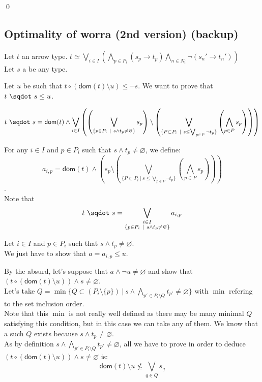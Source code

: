 \documentclass[a4paper]{article}%
\newcommand{\worra}[2]{#1\mathop{\,\sqdot\,} #2}
\newcommand{\apply}[2]{#1\circ#2}
\newcommand{\dom}[1]{\textsf{dom}(#1)}
\newcommand{\alt}{~|~}
\begin{document}
    \qed

    \pagebreak

    \subsection{Optimality of worra (2nd version) (backup)}

    Let $t$ an arrow type. $t \simeq \bigvee_{i\in I}\left(\bigwedge_{p\in P_i}(s_p\to t_p)\bigwedge_{n\in N_i}\neg(s_n'\to t_n')\right)$\\
    Let $s$ a be any type.

    Let $u$ be such that $\apply t {(\dom t \setminus u)} \leq \neg s$. We want to prove that $\worra t s \leq u$.

    \[\worra t s = \dom t \wedge\bigvee_{i\in I}\left(\left(\bigvee_{\{p\in P_i\alt s\wedge t_p\not=\varnothing\}}s_p\right) \setminus \left(\bigvee_{\{P \subset P_i\alt s \leq \bigvee_{p \in P} \neg t_p\}} \left(\bigwedge_{p \in P} s_p\right) \right)\right)\]

    For any $i \in I$ and $p \in P_i$ such that $s \land t_p \neq \varnothing$, we define:
    \[a_{i,p}=\dom t \land \left(s_p \setminus \left(\bigvee_{\{P \subset P_i\alt s \leq \bigvee_{p \in P} \neg t_p\}} \left(\bigwedge_{p \in P} s_p\right) \right)\right)\].\\
    Note that \[\worra t s = \bigvee_{\substack{i \in I\\ \{p \in P_i \alt s \land t_p \neq \varnothing\}}} a_{i,p} \]

    Let $i \in I$ and $p \in P_i$ such that $s \land t_p \neq \varnothing$.\\
    We just have to show that $a = a_{i,p} \leq u$.

    By the absurd, let's suppose that $a \land \neg u \neq \varnothing$ and show that $(\apply t {(\dom t \setminus u)}) \land s \neq \varnothing$.\\

    Let's take $Q = \min \{ Q \subset (P_i \setminus \{p\}) \alt s \land \bigwedge_{p' \in P_i\setminus Q} t_{p'} \neq \varnothing \}$ with $\min$ refering to the set inclusion order.\\
    Note that this $\min$ is not really well defined as there may be many minimal $Q$ satisfying this condition, but in this case we can take any of them.     We know that a such $Q$ exists because $s \land t_p \neq \varnothing$.\\

    As by definition $s \land \bigwedge_{p'\in P_i\setminus Q}t_{p'} \neq \varnothing$, all we have to prove in order to deduce $(\apply t {(\dom t \setminus u)}) \land s \neq \varnothing$ is:\\
    \[ \dom t \setminus u \not\leq \bigvee_{q\in Q}s_q \]
\end{document}
